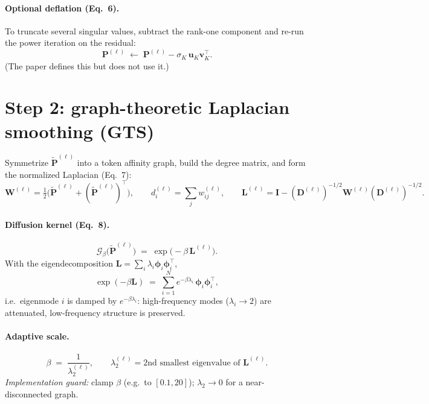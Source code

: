 \documentclass[11pt]{article}
\newcommand{\D}{\mathbf{D}}
\newcommand{\I}{\mathbf{I}}
\newcommand{\Lap}{\mathbf{L}}
\newcommand{\Pm}{\mathbf{P}}
\newcommand{\Pt}{\tilde{\mathbf{P}}}
\newcommand{\W}{\mathbf{W}}
\newcommand{\uu}{\mathbf{u}}
\newcommand{\vv}{\mathbf{v}}
\newcommand{\Gcal}{\mathcal{G}}
\begin{document}
\paragraph{Optional deflation (Eq.~6).} To truncate several singular values, subtract
the rank-one component and re-run the power iteration on the residual:
\begin{equation}
\Pm^{(\ell)} \;\leftarrow\; \Pm^{(\ell)} - \sigma_K\,\uu_K\vv_K^{\top}.
\end{equation}
(The paper defines this but does not use it.)

\section{Step 2: graph-theoretic Laplacian smoothing (GTS)}

Symmetrize $\Pt^{(\ell)}$ into a token affinity graph, build the degree matrix, and
form the normalized Laplacian (Eq.~7):
\begin{equation}
\W^{(\ell)} = \tfrac{1}{2}\Big(\Pt^{(\ell)} + (\Pt^{(\ell)})^{\!\top}\Big),
\qquad
d_i^{(\ell)} = \sum_j w_{ij}^{(\ell)},
\qquad
\Lap^{(\ell)} = \I - (\D^{(\ell)})^{-1/2}\W^{(\ell)}(\D^{(\ell)})^{-1/2}.
\end{equation}

\paragraph{Diffusion kernel (Eq.~8).}
\begin{equation}
\Gcal_\beta\big(\Pt^{(\ell)}\big) \;=\; \exp\!\big(-\beta\,\Lap^{(\ell)}\big).
\end{equation}
With the eigendecomposition $\Lap = \sum_i \lambda_i \bm{\phi}_i\bm{\phi}_i^{\top}$,
\begin{equation}
\exp(-\beta\Lap) \;=\; \sum_{i=1}^{N} e^{-\beta\lambda_i}\,\bm{\phi}_i\bm{\phi}_i^{\top},
\end{equation}
i.e.\ eigenmode $i$ is damped by $e^{-\beta\lambda_i}$: high-frequency modes
($\lambda_i \to 2$) are attenuated, low-frequency structure is preserved.

\paragraph{Adaptive scale.}
\begin{equation}
\beta \;=\; \frac{1}{\lambda_2^{(\ell)}},
\qquad
\lambda_2^{(\ell)} = \text{2nd smallest eigenvalue of } \Lap^{(\ell)} .
\end{equation}
\emph{Implementation guard:} clamp $\beta$ (e.g.\ to $[0.1,20]$); $\lambda_2\to 0$ for a
near-disconnected graph.
\end{document}
